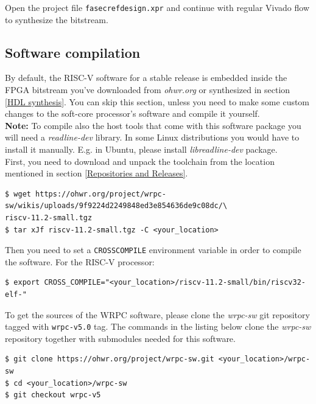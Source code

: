 \documentclass[a4paper, 12pt]{article}
\renewcommand{\_}{\underscore\allowbreak}
\begin{document}
Open the project file \texttt{fasec\_ref\_design.xpr} and continue with regular
Vivado flow to synthesize the bitstream.

\subsection{Software compilation}
\label{Software compilation}

By default, the RISC-V software for a stable release is embedded
inside the FPGA bitstream you've downloaded from \textit{ohwr.org} or
synthesized in section \ref{HDL synthesis}. You can skip this section, unless
you need to make some custom changes to the soft-core processor's software and
compile it yourself.\\

\textbf{Note:} To compile also the host tools that come with this software
package you will need a \emph{readline-dev} library. In some Linux distributions
you would have to install it manually. E.g. in Ubuntu, please install
\emph{libreadline-dev} package.\\

First, you need to download and unpack the toolchain from the location
mentioned in section \ref{Repositories and Releases}.
\begin{lstlisting}
$ wget https://ohwr.org/project/wrpc-sw/wikis/uploads/9f9224d2249848ed3e854636de9c08dc/\
riscv-11.2-small.tgz
$ tar xJf riscv-11.2-small.tgz -C <your_location>
\end{lstlisting}

Then you need to set a \texttt{CROSS\_COMPILE} environment variable in order
to compile the software. For the RISC-V processor:
\begin{lstlisting}
$ export CROSS_COMPILE="<your_location>/riscv-11.2-small/bin/riscv32-elf-"
\end{lstlisting}

To get the sources of the WRPC software, please clone the \textit{wrpc-sw} git
repository tagged with \texttt{wrpc-v5.0} tag. The commands in the listing below
clone the \textit{wrpc-sw} repository together with submodules needed for this software.\\
\begin{lstlisting}
$ git clone https://ohwr.org/project/wrpc-sw.git <your_location>/wrpc-sw
$ cd <your_location>/wrpc-sw
$ git checkout wrpc-v5
\end{lstlisting}
\end{document}

